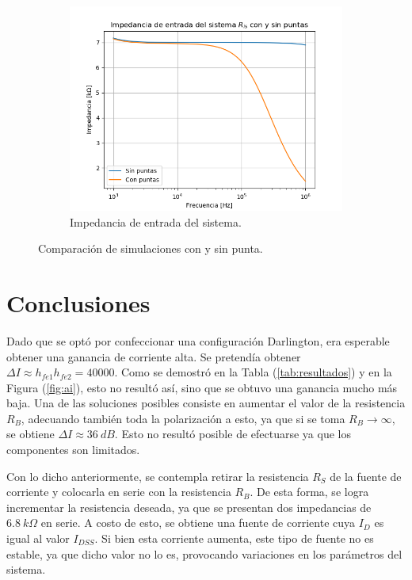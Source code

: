 \begin{figure}[H]
\begin{subfigure}{.5\textwidth}
	\includegraphics[width=1\textwidth]{Imagenes/Ris_cp.png}
	\caption{Impedancia de entrada del sistema.}
	\label{fig:ris-cp}
\end{subfigure}
\caption{Comparación de simulaciones con y sin punta.}
\label{fig:cpvssp}
\end{figure}

\section{Conclusiones} \label{sec:conclusiones}
Dado que se optó por confeccionar una configuración Darlington, era esperable obtener una ganancia de corriente alta. Se pretendía obtener $\Delta I \approx h_{fe1} h_{fe2} = 40000$. Como se demostró en la Tabla (\ref{tab:resultados}) y en la Figura (\ref{fig:ai}), esto no resultó así, sino que se obtuvo una ganancia mucho más baja. Una de las soluciones posibles consiste en aumentar el valor de la resistencia $R_B$, adecuando también toda la polarización a esto, ya que si se toma $R_B \rightarrow \infty$, se obtiene $\Delta I \approx 36 \ dB$. Esto no resultó posible de efectuarse ya que los componentes son limitados. 

Con lo dicho anteriormente, se contempla retirar la resistencia $R_S$ de la fuente de corriente y colocarla en serie con la resistencia $R_B$. De esta forma, se logra incrementar la resistencia deseada, ya que se presentan dos impedancias de $6.8 \ k\Omega$ en serie. A costo de esto, se obtiene una fuente de corriente cuya $I_D$ es igual al valor $I_{DSS}$. Si bien esta corriente aumenta, este tipo de fuente no es estable, ya que dicho valor no lo es, provocando variaciones en los parámetros del sistema.


